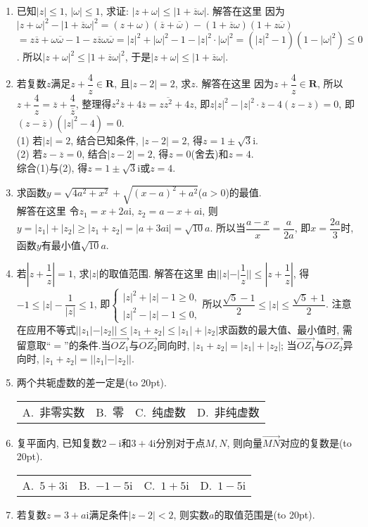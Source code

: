 \documentclass[10pt,a4paper]{article}
\newcommand{\bracket}[1]{(\hbox to #1pt{})}
\newcommand{\fourch}[4]{\par\begin{tabular}{p{.23\textwidth}p{.23\textwidth}p{.23\textwidth}p{.23\textwidth}}
A.~#1 &B.~#2& C.~#3& D.~#4
\end{tabular}}
\begin{document}
\begin{enumerate}[1.]
\item 已知$|z|\le 1$, $|\omega|\le 1$, 求证: $|z+\omega|\le|1+\overline z\omega|$.
解答在这里  因为$|z+\omega|^2-|1+\overline z\omega|^2=(z+\omega)(\overline z+\overline \omega)-(1+\overline z\omega)(1+z\overline \omega)$
$=z\overline z+\omega \overline \omega -1-z\overline z\omega \overline \omega =|z|^2+|\omega|^2-1-|z|^2\cdot|\omega|^2=(|z|^2-1)(1-|\omega|^2)\le 0$.
所以$|z+\omega|^2\le|1+\overline z\omega|^2$, 于是$|z+\omega|\le|1+\overline z\omega|$.
\item 若复数$z$满足$z+\dfrac 4z\in \mathbf{R}$, 且$|z-2|=2$, 求$z$.
解答在这里  因为$z+\dfrac 4z\in \mathbf{R}$, 所以$z+\dfrac 4z=\overline z+\dfrac 4{\overline z}$, 整理得$z^2\overline z+4\overline z=z\overline{z^2}+4z$,
即$z|z|^2-|z|^2\cdot \overline z-4(z-\overline z)=0$, 即$(z-\overline z)(|z|^2-4)=0$.\\
(1) 若$|z|=2$, 结合已知条件, $|z-2|=2$, 得$z=1\pm \sqrt 3\mathrm{i}$.\\
(2) 若$z-\overline z=0$, 结合$|z-2|=2$, 得$z=0$(舍去)和$z=4$.\\
综合(1)与(2), 得$z=1\pm \sqrt 3\mathrm{i}$或$z=4$.
\item 求函数$y=\sqrt {4a^2+x^2}+\sqrt {(x-a)^2+a^2}$($a>0$)的最值.\\
解答在这里  令$z_1=x+2a\mathrm{i}$, $z_2=a-x+a\mathrm{i}$,
则$y=|z_1|+|z_2|\ge|z_1+z_2|=|a+3a\mathrm{i}|=\sqrt {10}a$.
所以当$\dfrac{a-x}x=\dfrac a{2a}$, 即$x=\dfrac{2a}3$时, 函数$y$有最小值$\sqrt {10}a$.
\item 若$|z+\dfrac 1z|=1$, 求$|z|$的取值范围.
解答在这里  由$||z|-|\dfrac 1z||\le|z+\dfrac 1z|$, 得$-1\le|z|-\dfrac 1{|z|}\le 1$,
即$\begin{cases}|z|^2+|z|-1\ge 0, \\|z|^2-|z|-1\le 0, \end{cases}$所以$\dfrac{\sqrt 5-1}2\le|z|\le \dfrac{\sqrt 5+1}2$.
注意  在应用不等式$||z_1|-|z_2||\le|z_1+z_2|\le|z_1|+|z_2|$求函数的最大值、最小值时, 需留意取``$=$''的条件.当$\overrightarrow{OZ_1}$与$\overrightarrow{OZ_2}$同向时, $|z_1+z_2|=|z_1|+|z_2|$; 当$\overrightarrow{OZ_1}$与$\overrightarrow{OZ_2}$异向时, $|z_1+z_2|=||z_1|-|z_2||$.
\item 两个共轭虚数的差一定是\bracket{20}.
\fourch{非零实数}{零}{纯虚数}{非纯虚数}
\item 复平面内, 已知复数$2-\mathrm{i}$和$3+4\mathrm{i}$分別对于点$M,N$, 则向量$\overrightarrow{MN}$对应的复数是\bracket{20}.
\fourch{$5+3\mathrm{i}$}{$-1-5\mathrm{i}$}{$1+5\mathrm{i}$}{$1-5\mathrm{i}$}
\item 若复数$z=3+a\mathrm{i}$满足条件$|z-2|<2$, 则实数$a$的取值范围是\bracket{20}.

\end{enumerate}
\end{document}
